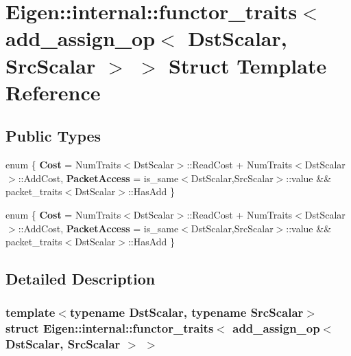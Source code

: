 \hypertarget{struct_eigen_1_1internal_1_1functor__traits_3_01add__assign__op_3_01_dst_scalar_00_01_src_scalar_01_4_01_4}{}\section{Eigen\+:\+:internal\+:\+:functor\+\_\+traits$<$ add\+\_\+assign\+\_\+op$<$ Dst\+Scalar, Src\+Scalar $>$ $>$ Struct Template Reference}
\label{struct_eigen_1_1internal_1_1functor__traits_3_01add__assign__op_3_01_dst_scalar_00_01_src_scalar_01_4_01_4}
\subsection*{Public Types}
\begin{DoxyCompactItemize}
\item 
\mbox{\label{struct_eigen_1_1internal_1_1functor__traits_3_01add__assign__op_3_01_dst_scalar_00_01_src_scalar_01_4_01_4_ada7f67eb428380695d51ee8e55eb6546}} 
enum \{ {\bfseries Cost} = Num\+Traits$<$Dst\+Scalar$>$\+:\+:Read\+Cost + Num\+Traits$<$Dst\+Scalar$>$\+:\+:Add\+Cost, 
{\bfseries Packet\+Access} = is\+\_\+same$<$Dst\+Scalar,Src\+Scalar$>$\+:\+:value \&\& packet\+\_\+traits$<$Dst\+Scalar$>$\+:\+:Has\+Add
 \}
\item 
\mbox{\label{struct_eigen_1_1internal_1_1functor__traits_3_01add__assign__op_3_01_dst_scalar_00_01_src_scalar_01_4_01_4_af60ab564841d6982e585631a83b80575}} 
enum \{ {\bfseries Cost} = Num\+Traits$<$Dst\+Scalar$>$\+:\+:Read\+Cost + Num\+Traits$<$Dst\+Scalar$>$\+:\+:Add\+Cost, 
{\bfseries Packet\+Access} = is\+\_\+same$<$Dst\+Scalar,Src\+Scalar$>$\+:\+:value \&\& packet\+\_\+traits$<$Dst\+Scalar$>$\+:\+:Has\+Add
 \}
\end{DoxyCompactItemize}


\subsection{Detailed Description}
\subsubsection*{template$<$typename Dst\+Scalar, typename Src\+Scalar$>$\newline
struct Eigen\+::internal\+::functor\+\_\+traits$<$ add\+\_\+assign\+\_\+op$<$ Dst\+Scalar, Src\+Scalar $>$ $>$}



